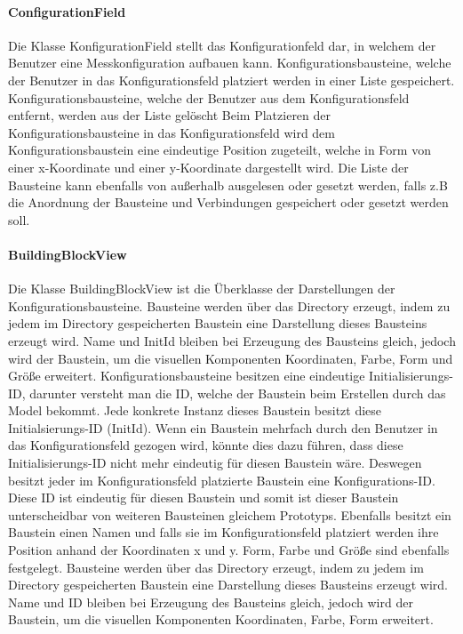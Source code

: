 \documentclass[parskip=full]{scrartcl}
\begin{document}
\paragraph{ConfigurationField}
Die Klasse KonfigurationField stellt das Konfigurationfeld dar, in welchem der Benutzer eine Messkonfiguration aufbauen kann.
Konfigurationsbausteine, welche der Benutzer in das Konfigurationsfeld platziert werden in einer Liste gespeichert. 
Konfigurationsbausteine, welche der Benutzer aus dem Konfigurationsfeld entfernt, werden aus der Liste gelöscht
Beim Platzieren der Konfigurationsbausteine in das Konfigurationsfeld wird dem Konfigurationsbaustein eine eindeutige Position zugeteilt, welche in Form von einer x-Koordinate und einer y-Koordinate dargestellt wird.
Die Liste der Bausteine kann ebenfalls von außerhalb ausgelesen oder gesetzt werden, falls z.B die Anordnung der Bausteine und Verbindungen gespeichert oder gesetzt werden soll.

\paragraph{BuildingBlockView}
Die Klasse BuildingBlockView ist die Überklasse der Darstellungen der Konfigurationsbausteine.
Bausteine werden über das Directory erzeugt, indem zu jedem im Directory gespeicherten Baustein eine Darstellung dieses Bausteins erzeugt wird. Name und InitId bleiben bei Erzeugung des Bausteins gleich, jedoch wird der Baustein, um die visuellen Komponenten Koordinaten, Farbe, Form und Größe erweitert.
Konfigurationsbausteine besitzen eine eindeutige Initialisierungs-ID, darunter versteht man die ID, welche der Baustein beim Erstellen durch das Model bekommt. Jede konkrete Instanz dieses Baustein besitzt diese Initialsierungs-ID (InitId). Wenn ein Baustein mehrfach durch den Benutzer in das Konfigurationsfeld gezogen wird, könnte dies dazu führen, dass diese Initialisierungs-ID nicht mehr eindeutig für diesen Baustein wäre. Deswegen besitzt jeder im Konfigurationsfeld platzierte Baustein eine Konfigurations-ID. Diese ID ist eindeutig für diesen Baustein und somit ist dieser Baustein unterscheidbar von weiteren Bausteinen gleichem Prototyps. Ebenfalls besitzt ein Baustein einen Namen und falls sie im Konfigurationsfeld platziert werden ihre Position anhand der Koordinaten x und y. Form, Farbe und Größe sind ebenfalls festgelegt.  
Bausteine werden über das Directory erzeugt, indem zu jedem im Directory gespeicherten Baustein eine Darstellung dieses Bausteins erzeugt wird. Name und ID bleiben bei Erzeugung des Bausteins gleich, jedoch wird der Baustein, um die visuellen Komponenten Koordinaten, Farbe, Form erweitert.
\end{document}
